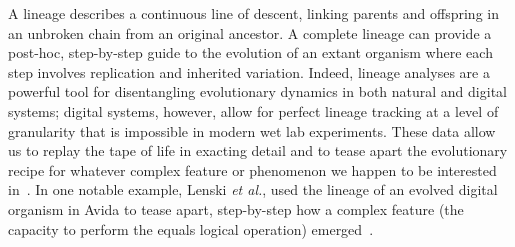 \documentclass[letterpaper]{article}
\begin{document}
A lineage describes a continuous line of descent, linking %
parents and offspring in an unbroken chain from an original ancestor.
A complete lineage can provide a post-hoc, step-by-step guide to the evolution of an extant organism where each step involves replication and inherited variation. Indeed, lineage analyses are a powerful tool for disentangling evolutionary dynamics in both natural and digital systems; digital systems, however, allow for 
perfect lineage tracking at a level of granularity that is
impossible in modern wet lab experiments.  These data allow us to replay the tape of life in exacting detail and to tease apart the evolutionary recipe for whatever complex feature or phenomenon we happen to be interested in~\citep{mcphee_using_2016}. 
In 
one notable
example, Lenski \textit{et al.}, used the lineage of an evolved digital organism in Avida to tease apart, step-by-step how a complex feature (the capacity to perform the equals logical operation) emerged~\citep{lenski_evolutionary_2003}. %
\end{document}
